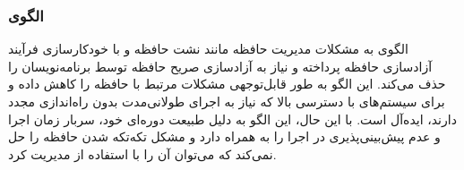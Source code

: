 \subsubsection{الگوی }
\label{memGarbCollectionSec}
\begin{RTL}
الگوی  \cite{ref4} به مشکلات
مدیریت حافظه مانند نشت حافظه و  با
خودکارسازی فرآیند آزادسازی حافظه پرداخته و نیاز به آزادسازی صریح
حافظه توسط برنامه‌نویسان را حذف می‌کند. این الگو به طور
قابل‌توجهی مشکلات مرتبط با حافظه را کاهش داده و برای سیستم‌های
با دسترسی بالا که نیاز به اجرای طولانی‌مدت بدون راه‌اندازی مجدد دارند،
ایده‌آل است. با این حال، این الگو به دلیل طبیعت دوره‌ای خود، سربار
زمان اجرا و عدم پیش‌بینی‌پذیری در اجرا را به همراه دارد و
مشکل تکه‌تکه شدن حافظه را حل نمی‌کند که می‌توان
آن را با استفاده از  مدیریت کرد.
\end{RTL}